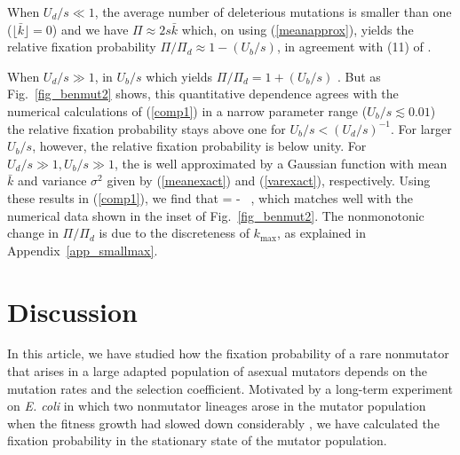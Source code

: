 \documentclass[preprint,12pt,number]{elsarticle}
\begin{document}
When $U_d/s \ll 1$, the average number of deleterious mutations is  smaller than one ($\lfloor \bar k \rfloor=0$) and we have $\Pi \approx 2 s  {\bar k}$ which, on using (\ref{meanapprox}), yields the relative fixation probability $\Pi/\Pi_d \approx 1- (U_b/s)$, in agreement with (11) of \citep{James:2016}. 

When $U_d/s \gg 1$,   in $U_b/s$ which yields $\Pi/\Pi_d =1+(U_b/s)$ \citep{James:2016}. But as Fig.~\ref{fig_benmut2} shows, this quantitative dependence agrees with the numerical calculations of (\ref{comp1}) in a narrow parameter range ($U_b/s \lesssim 0.01$)   the relative fixation probability stays above one for $U_b/s < (U_d/s)^{-1}$. For larger $U_b/s$, however, the relative fixation probability is below unity. For $U_d/s \gg 1, U_b/s \gg 1$, the  is well approximated by a Gaussian function \citep{Jain:2016} with mean ${\bar k}$ and variance $\sigma^2$ given by (\ref{meanexact}) and (\ref{varexact}), respectively. Using these results in  (\ref{comp1}), we find that 
\be
{} = - ~,
\label{ben_new}
\ee
which matches well with the numerical data  shown in the inset of Fig.~\ref{fig_benmut2}. The nonmonotonic change in $\Pi/\Pi_d$ is due to the discreteness of $k_{\max}$, as explained in Appendix~\ref{app_smallmax}. 


\section{Discussion}
\label{disc}

In this article, we have studied how the fixation probability of a rare nonmutator that arises in a large adapted population of asexual mutators depends on the mutation rates and the selection coefficient.  
Motivated by a long-term experiment on {\it E. coli} in which two nonmutator lineages arose in the mutator population when the fitness growth had slowed down considerably \citep{Wielgoss:2013}, we have calculated the fixation probability in the stationary state of the mutator population. 
\end{document}
